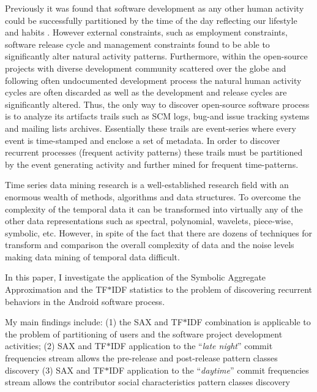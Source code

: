 \documentclass[10pt, conference, compsocconf]{IEEEtran}
\begin{document}
Previously it was found that software development as any other human activity could be 
successfully partitioned by the time of the day reflecting our lifestyle and habits
\cite{citeulike:10392325} \cite{citeulike:10392305}. However external constraints, 
such as employment constraints, software release cycle \cite{citeulike:2739216} 
and management constraints \cite{citeulike:6095797} found to be able to significantly alter 
natural activity patterns. Furthermore, within the open-source projects with 
diverse development community scattered over the globe and following often undocumented 
development process the natural human activity cycles are often discarded as well as the 
development and release cycles are significantly altered.
Thus, the only way to discover open-source software process is to analyze its artifacts 
trails such as SCM logs, bug-and issue tracking systems and mailing lists archives.
Essentially these trails are event-series where every event is time-stamped and enclose 
a set of metadata. In order to discover recurrent processes (frequent activity patterns)
these trails must be partitioned by the event generating activity and further mined for 
frequent time-patterns. 

Time series data mining research is a well-established research field with an enormous wealth 
of methods, algorithms and data structures. To overcome the complexity of the temporal data 
it can be transformed into virtually any of the other data representations such as spectral, 
polynomial, wavelets, piece-wise, symbolic, etc. However, in spite of the fact that there are
dozens of techniques for transform and comparison the overall complexity of data and the noise
levels making data mining of temporal data difficult.

In this paper, I investigate the application of the Symbolic Aggregate Approximation 
\cite{citeulike:2821475} and the TF$\ast$IDF statistics \cite{citeulike:3056638} to the problem 
of discovering recurrent behaviors in the Android software process.


My main findings include: (1) the SAX and TF$\ast$IDF combination is applicable to the 
problem of partitioning of users and the software project development activities;
(2) SAX and TF$\ast$IDF application to the ``\textit{late night}'' commit frequencies stream
allows the pre-release and post-release pattern classes discovery 
(3) SAX and TF$\ast$IDF application to the ``\textit{daytime}'' commit frequencies stream
allows the contributor social characteristics pattern classes discovery 
\end{document}
